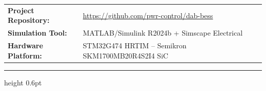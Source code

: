 \documentclass[12pt, a4paper]{article}
\newcommand{\MetaLabelA}{Project Repository}
\newcommand{\MetaValueA}{\url{https://github.com/pwr-control/dab-bess}}
\newcommand{\MetaLabelB}{Simulation Tool}
\newcommand{\MetaValueB}{MATLAB/Simulink R2024b + Simscape Electrical}
\newcommand{\MetaLabelC}{Hardware Platform}
\newcommand{\MetaValueC}{STM32G474 HRTIM -- Semikron SKM1700MB20R4S2I4 SiC}
\begin{document}
\noindent
\begin{tabularx}{\linewidth}{@{} l X @{}}
    \small\sffamily\textbf{\MetaLabelA:} & \small\sffamily\MetaValueA \\[4pt]
    \small\sffamily\textbf{\MetaLabelB:} & \small\sffamily\MetaValueB \\[4pt]
    \small\sffamily\textbf{\MetaLabelC:} & \small\sffamily\MetaValueC \\
\end{tabularx}

\vspace{8pt}
{\color{ruleblue}\hrule height 0.6pt}

\newpage
{}
\setcounter{page}{1}

\end{document}
